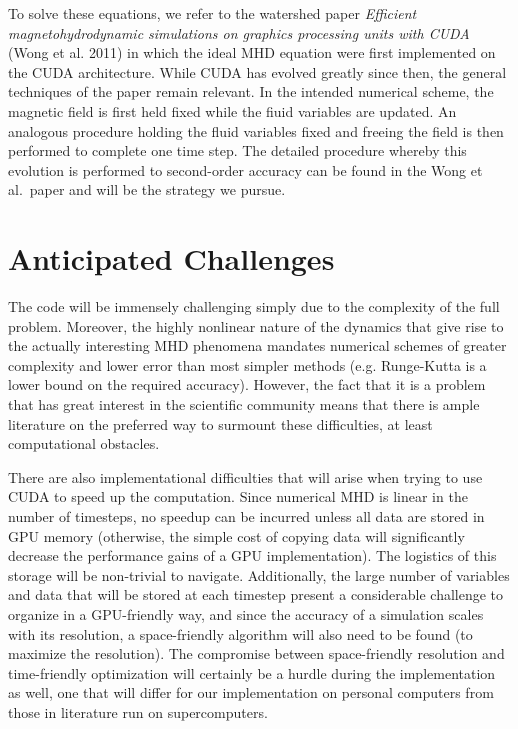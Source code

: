 \documentclass[10pt,twocolumn]{article}
\begin{document}
To solve these equations, we refer to the watershed paper \emph{Efficient
magnetohydrodynamic simulations on graphics processing units with CUDA} (Wong et
al. 2011) in which the ideal MHD equation were first implemented on the CUDA
architecture. While CUDA has evolved greatly since then, the general techniques
of the paper remain relevant. In the intended numerical scheme, the magnetic
field is first held fixed while the fiuid variables are updated. An analogous
procedure holding the fluid variables fixed and freeing the field is then
performed to complete one time step. The detailed procedure whereby this
evolution is performed to second-order accuracy can be found in the Wong et al.\
paper and will be the strategy we pursue.

\section{Anticipated Challenges}

The code will be immensely challenging simply due to the complexity of the full
problem. Moreover, the highly nonlinear nature of the dynamics that give rise to
the actually interesting MHD phenomena mandates numerical schemes of greater
complexity and lower error than most simpler methods (e.g. Runge-Kutta is a
lower bound on the required accuracy). However, the fact that it is a problem
that has great interest in the scientific community means that there is ample
literature on the preferred way to surmount these difficulties, at least
computational obstacles.

There are also implementational difficulties that will arise when trying to use
CUDA to speed up the computation. Since numerical MHD is linear in the number of
timesteps, no speedup can be incurred unless all data are stored in GPU memory
(otherwise, the simple cost of copying data will significantly decrease the
performance gains of a GPU implementation). The logistics of this storage will
be non-trivial to navigate. Additionally, the large number of variables and data
that will be stored at each timestep present a considerable challenge to
organize in a GPU-friendly way, and since the accuracy of a simulation scales
with its resolution, a space-friendly algorithm will also need to be found (to
maximize the resolution). The compromise between space-friendly resolution and
time-friendly optimization will certainly be a hurdle during the implementation
as well, one that will differ for our implementation on personal computers from
those in literature run on supercomputers.
\end{document}
